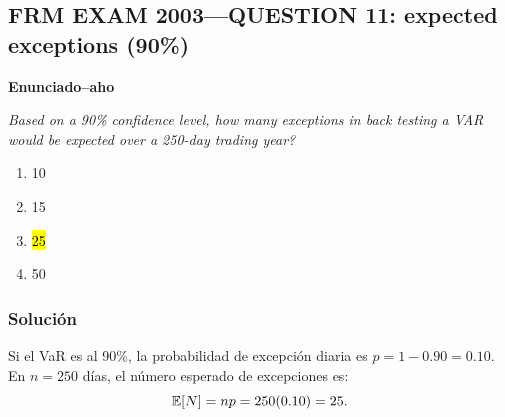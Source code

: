 ﻿\subsection{FRM EXAM 2003---QUESTION 11: expected exceptions (90\%)}



\textbf{Enunciado--aho}

\emph{Based on a 90\% confidence level,
how many exceptions in back testing a VAR would be expected over a
250-day trading year?}
\begin{enumerate}[label=\alph*.]
\item 10
\item 15
\item \hl{25}
\item 50
\end{enumerate}

\subsubsection*{Solución}


Si el VaR es al 90\%, la probabilidad de excepción diaria es \(p=1-0.90=0.10\).
En \(n=250\) días, el número esperado de excepciones es:
\[
\mathbb{E}[N]=np=250(0.10)=25.
\]











